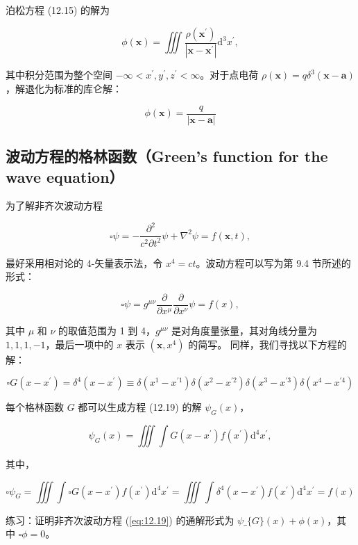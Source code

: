 泊松方程 (12.15) 的解为

$$
\phi(\mathbf{x})=\iiint \frac{\rho\left(\mathbf{x}^{\prime}\right)}{\left|\mathbf{x}-\mathbf{x}^{\prime}\right|} \mathrm{d}^{3} x^{\prime},
$$

其中积分范围为整个空间
$-\infty<x^{\prime}, y^{\prime}, z^{\prime}<\infty$。对于点电荷
$\rho(\mathbf{x})=q \delta^{3}(\mathbf{x}-\mathbf{a})$，解退化为标准的库仑解：

$$
\phi(\mathbf{x})=\frac{q}{|\mathbf{x}-\mathbf{a}|}
$$

\subsection{波动方程的格林函数（Green's function for the wave
equation）}

为了解非齐次波动方程

\begin{equation}\label{eq:12.19} 
 \square \psi=-\frac{\partial^{2}}{c^{2} \partial t^{2}} \psi+\nabla^{2} \psi=f(\mathbf{x}, t), 
 \end{equation}

最好采用相对论的 4-矢量表示法，令 $x^{4}=c t$。波动方程可以写为第 9.4
节所述的形式：

$$
\square \psi=g^{\mu \nu} \frac{\partial}{\partial x^{\mu}} \frac{\partial}{\partial x^{\nu}} \psi=f(x),
$$

其中 $\mu$ 和 $\nu$ 的取值范围为 1 到 4，$g^{\mu \nu}$
是对角度量张量，其对角线分量为 $1,1,1,-1$，最后一项中的 $x$ 表示
$\left(\mathbf{x}, x^{4}\right)$ 的简写。 同样，我们寻找以下方程的解：

\begin{equation}\label{eq:12.20} 
 \square G\left(x-x^{\prime}\right)=\delta^{4}\left(x-x^{\prime}\right) \equiv \delta\left(x^{1}-x^{\prime 1}\right) \delta\left(x^{2}-x^{\prime 2}\right) \delta\left(x^{3}-x^{\prime 3}\right) \delta\left(x^{4}-x^{\prime 4}\right) 
 \end{equation}

每个格林函数 $G$ 都可以生成方程 (12.19) 的解 $\psi_{G}(x)$，

$$
\psi_{G}(x)=\iiint \int G\left(x-x^{\prime}\right) f\left(x^{\prime}\right) \mathrm{d}^{4} x^{\prime},
$$

其中，

$$
\square \psi_{G}=\iiint \int \square G\left(x-x^{\prime}\right) f\left(x^{\prime}\right) \mathrm{d}^{4} x^{\prime}=\iiint \int \delta^{4}\left(x-x^{\prime}\right) f\left(x^{\prime}\right) \mathrm{d}^{4} x^{\prime}=f(x)
$$
\begin{exercise}
  练习：证明非齐次波动方程 (\ref{eq:12.19}) 的通解形式为 $ \psi\_\{G\}(x)+\phi(x)$，其中 $\square \phi=0$。
\end{exercise}

